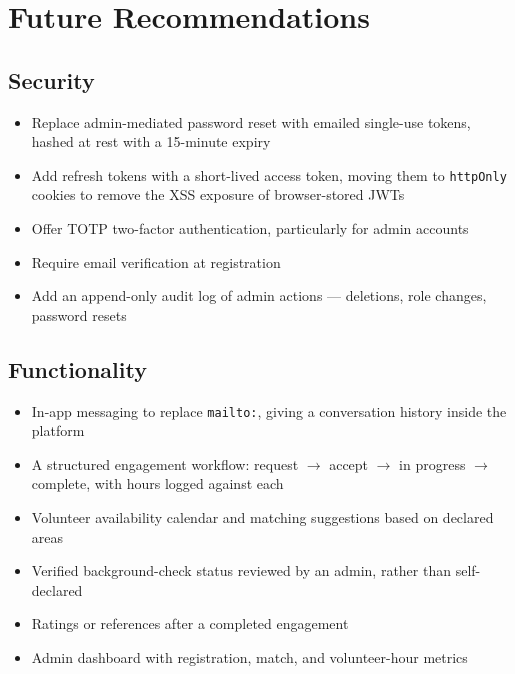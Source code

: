 \documentclass[11pt,letterpaper]{article}
\begin{document}
\section{Future Recommendations}

\subsection{Security}
\begin{itemize}
  \item Replace admin-mediated password reset with emailed single-use tokens,
        hashed at rest with a 15-minute expiry
  \item Add refresh tokens with a short-lived access token, moving them to
        \texttt{httpOnly} cookies to remove the XSS exposure of
        browser-stored JWTs
  \item Offer TOTP two-factor authentication, particularly for admin accounts
  \item Require email verification at registration
  \item Add an append-only audit log of admin actions --- deletions, role
        changes, password resets
\end{itemize}

\subsection{Functionality}
\begin{itemize}
  \item In-app messaging to replace \texttt{mailto:}, giving a conversation
        history inside the platform
  \item A structured engagement workflow: request $\rightarrow$ accept
        $\rightarrow$ in progress $\rightarrow$ complete, with hours logged
        against each
  \item Volunteer availability calendar and matching suggestions based on
        declared areas
  \item Verified background-check status reviewed by an admin, rather than
        self-declared
  \item Ratings or references after a completed engagement
  \item Admin dashboard with registration, match, and volunteer-hour metrics
\end{itemize}
\end{document}
